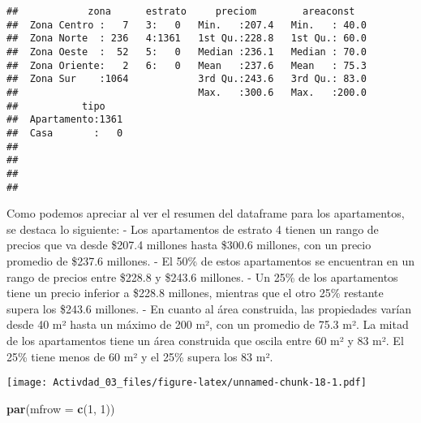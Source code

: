\documentclass[
]{article}
\newenvironment{Shaded}{\begin{snugshade}}{\end{snugshade}}
\newcommand{\AttributeTok}[1]{\textcolor[rgb]{0.13,0.29,0.53}{#1}}
\newcommand{\CommentTok}[1]{\textcolor[rgb]{0.56,0.35,0.01}{\textit{#1}}}
\newcommand{\DecValTok}[1]{\textcolor[rgb]{0.00,0.00,0.81}{#1}}
\newcommand{\FunctionTok}[1]{\textcolor[rgb]{0.13,0.29,0.53}{\textbf{#1}}}
\newcommand{\NormalTok}[1]{#1}
\newcommand{\SpecialCharTok}[1]{\textcolor[rgb]{0.81,0.36,0.00}{\textbf{#1}}}
\newcommand{\StringTok}[1]{\textcolor[rgb]{0.31,0.60,0.02}{#1}}
\begin{document}
\begin{verbatim}
##            zona      estrato     preciom        areaconst    
##  Zona Centro :   7   3:   0   Min.   :207.4   Min.   : 40.0  
##  Zona Norte  : 236   4:1361   1st Qu.:228.8   1st Qu.: 60.0  
##  Zona Oeste  :  52   5:   0   Median :236.1   Median : 70.0  
##  Zona Oriente:   2   6:   0   Mean   :237.6   Mean   : 75.3  
##  Zona Sur    :1064            3rd Qu.:243.6   3rd Qu.: 83.0  
##                               Max.   :300.6   Max.   :200.0  
##           tipo     
##  Apartamento:1361  
##  Casa       :   0  
##                    
##                    
##                    
## 
\end{verbatim}

Como podemos apreciar al ver el resumen del dataframe para los
apartamentos, se destaca lo siguiente: - Los apartamentos de estrato 4
tienen un rango de precios que va desde \$207.4 millones hasta \$300.6
millones, con un precio promedio de \$237.6 millones. - El 50\% de estos
apartamentos se encuentran en un rango de precios entre \$228.8 y
\$243.6 millones. - Un 25\% de los apartamentos tiene un precio inferior
a \$228.8 millones, mientras que el otro 25\% restante supera los
\$243.6 millones. - En cuanto al área construida, las propiedades varían
desde 40 m² hasta un máximo de 200 m², con un promedio de 75.3 m². La
mitad de los apartamentos tiene un área construida que oscila entre 60
m² y 83 m². El 25\% tiene menos de 60 m² y el 25\% supera los 83 m².

\begin{Shaded}
\end{Shaded}

\texttt{[image: Activdad\_03\_files/figure-latex/unnamed-chunk-18-1.pdf]}

\begin{Shaded}
\begin{Highlighting}[]
\FunctionTok{par}\NormalTok{(}\AttributeTok{mfrow =} \FunctionTok{c}\NormalTok{(}\DecValTok{1}\NormalTok{, }\DecValTok{1}\NormalTok{))}
\end{Highlighting}
\end{Shaded}
\end{document}
